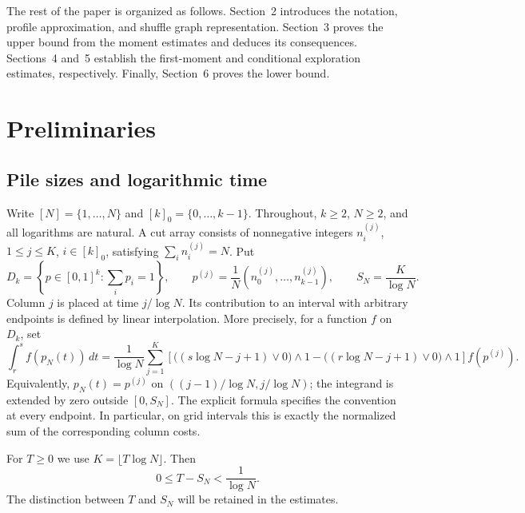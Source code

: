 \documentclass[11pt]{article}
\numberwithin{equation}{section}
\theoremstyle{definition}
\theoremstyle{remark}
\newcommand{\1}{\mathbf 1}
\begin{document}
The rest of the paper is organized as follows. Section~2 introduces
the notation, profile approximation, and shuffle graph representation.
Section~3 proves the upper bound from the moment estimates and deduces
its consequences. Sections~4 and~5 establish the first-moment and
conditional exploration estimates, respectively. Finally, Section~6
proves the lower bound.


\section{Preliminaries}
\label{sec:preliminaries}

\subsection{Pile sizes and logarithmic time}

Write $[N]=\{1,\ldots,N\}$ and $[k]_0=\{0,\ldots,k-1\}$. Throughout,
$k\ge2$, $N\ge2$, and all logarithms are natural. A cut array consists of
nonnegative integers $n_i^{(j)}$, $1\le j\le K$, $i\in[k]_0$, satisfying
$\sum_i n_i^{(j)}=N$. Put
\[
 D_k=\left\{p\in[0,1]^k:\sum_i p_i=1\right\},\qquad
 p^{(j)}=\frac1N(n_0^{(j)},\ldots,n_{k-1}^{(j)}),\qquad
 S_N=\frac K{\log N}.
\]
Column $j$ is placed at time $j/\log N$. Its contribution to an interval
with arbitrary endpoints is defined by linear interpolation. More
precisely, for a function $f$ on $D_k$, set
\begin{equation}%
\label{eq:empirical-integral}
 \int_r^s f(p_N(t))\,dt
 =\frac1{\log N}\sum_{j=1}^K
 \left[\bigl((s\log N-j+1)\vee0\bigr)\wedge1
       -\bigl((r\log N-j+1)\vee0\bigr)\wedge1\right]f(p^{(j)}).
\end{equation}
Equivalently, $p_N(t)=p^{(j)}$ on
$((j-1)/\log N,j/\log N)$; the integrand is extended by zero outside
$[0,S_N]$. The explicit formula specifies the convention at every
endpoint. In particular, on grid intervals this is exactly the normalized
sum of the corresponding column costs.

For $T\ge0$ we use $K=\lfloor T\log N\rfloor$. Then
\begin{equation}%
\label{eq:horizon-rounding}
 0\le T-S_N<\frac1{\log N}.
\end{equation}
The distinction between $T$ and $S_N$ will be retained in the estimates.
\end{document}
